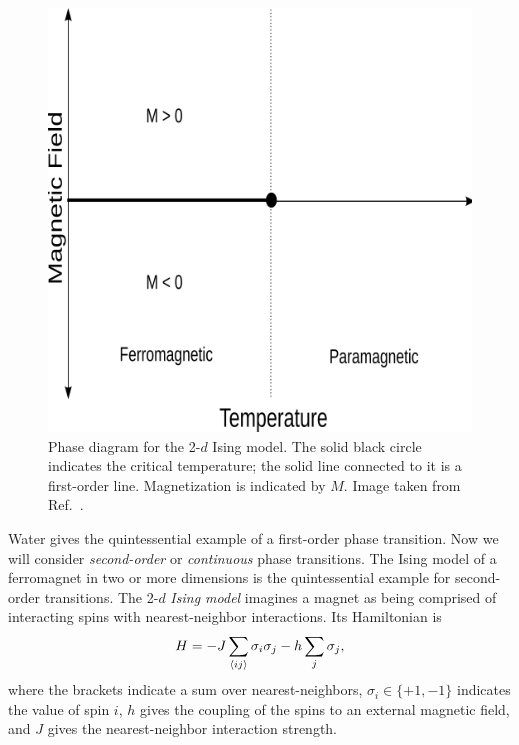 \begin{figure}
\centering
\includegraphics[width=\linewidth]{figs/ising_phase_diagram.png}
\caption{Phase diagram for the 2-$d$ Ising model. The solid black
circle indicates the critical temperature; the solid line connected to it is a
first-order line. Magnetization is indicated by $M$.
Image taken from Ref.~\cite{ising_picture}.}
\label{fig:phase_ising}
\end{figure}

Water gives the quintessential example of a first-order phase transition. Now we
will consider {\it second-order} or {\it continuous} phase
transitions. The Ising model of a ferromagnet in two or more
dimensions is the quintessential example for second-order transitions.
The 2-$d$ {\it Ising model} 
imagines a magnet as being comprised of interacting spins
with nearest-neighbor interactions. Its Hamiltonian is
\begin{equation}
H=-J\sum_{\ev{i j}} \sigma_i \sigma_j-h \sum_j
\sigma_j,
\end{equation}
where the brackets indicate a sum over nearest-neighbors,
$\sigma_i\in\{+1,-1\}$ indicates the value of spin $i$, $h$ gives the
coupling of the spins to an external magnetic field, and $J$ gives the
nearest-neighbor interaction strength.


